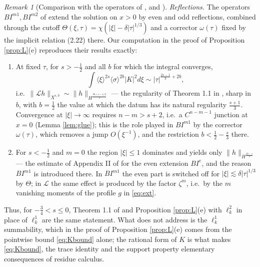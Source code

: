 \documentclass[10pt,reqno]{amsart}
\theoremstyle{remark}
\newtheorem{remark}[theorem]{Remark}
\numberwithin{equation}{section}
\newcommand{\lan}{\langle}
\newcommand{\ran}{\rangle}
\newcommand{\Lc}{\mathcal{L}}
\newcommand{\sig}{\sigma}
\begin{document}
\begin{remark}[Comparison with the operators of \cite{CK,Holmer}, \cite{BSZ2} and \cite{ET,HY,CT,GK}]
\emph{Reflections.} The operators $BI^{m1},BI^{m2}$ of \cite{BSZ2} extend the solution on $x>0$ by even and odd reflections, combined through the cutoff $\Theta(\xi,\tau)=\chi(|\xi|-\delta|\tau|^{1/3})$ and a corrector $\omega(\tau)$ fixed by the implicit relation (2.22) there. Our computation in the proof of Proposition \ref{prop:L}(e) reproduces their results exactly:
\begin{enumerate}
\item[(i)] At fixed $\tau$, for $s>-\frac12$ and all $b$ for which the integral converges, $$\int\lan\xi\ran^{2s}\lan\sig\ran^{2b}|K|^2d\xi\sim|\tau|^{\frac{2s-1}3+2b},$$ i.e.\ $\|\Lc h\|_{X^{s,b}}\sim\|h\|_{H^{\frac{3b+s-1/2}3}}$ --- the regularity of Theorem 1.1 in \cite{BSZ2}, sharp in $b$, with $b=\frac12$ the value at which the datum has its natural regularity $\frac{s+1}3$. Convergence at $|\xi|\to\infty$ requires $n-m>s+2$, i.e.\ a $C^{n-m-1}$ junction at $x=0$ (Lemma \ref{lem:glue}); this is the role played in $BI^{m1}$ by the corrector $\omega(\tau)$, which removes a jump $O(\xi^{-1})$, and the restriction $b<\frac12-\frac s3$ there.
\item[(ii)] For $s<-\frac12$ and $m=0$ the region $|\xi|\le1$ dominates and yields only $\|h\|_{H^{\frac{3b-1}3}}$ --- the estimate of Appendix II of \cite{BSZ2} for the even extension $BI^e$, and the reason $BI^{m1}$ is introduced there. In $BI^{m1}$ the even part is switched off for $|\xi|\lesssim\delta|\tau|^{1/3}$ by $\Theta$; in $\Lc$ the same effect is produced by the factor $\zeta^m$, i.e.\ by the $m$ vanishing moments of the profile $g$ in \eqref{eq:ext}.
\end{enumerate}
Thus, for $-\frac34<s\le0$, Theorem 1.1 of \cite{BSZ2} and Proposition \ref{prop:L}(e) with $\ell^2_k$ in place of $\ell^1_k$ are the same statement. What \cite{BSZ2} does not address is the $\ell^1_k$ summability, which in the proof of Proposition \ref{prop:L}(e) comes from the pointwise bound \eqref{eq:Kbound} alone; the rational form of $K$ is what makes \eqref{eq:Kbound}, the trace identity and the support property elementary consequences of residue calculus.


\end{remark}
\end{document}
